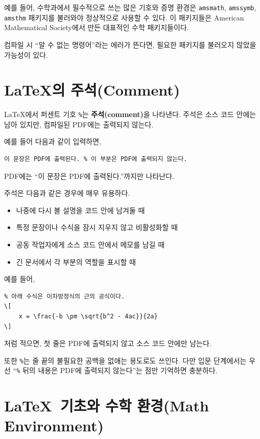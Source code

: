 \documentclass[11pt, a4paper]{article}
\theoremstyle{plain}
\theoremstyle{definition}
\theoremstyle{remark}
\begin{document}
예를 들어, 수학과에서 필수적으로 쓰는 많은 기호와 증명 환경은 \verb|amsmath|, \verb|amssymb|, \verb|amsthm| 패키지를 불러와야 정상적으로 사용할 수 있다. 이 패키지들은 American Mathematical Society에서 만든 대표적인 수학 패키지들이다.

컴파일 시 ``알 수 없는 명령어''라는 에러가 뜬다면, 필요한 패키지를 불러오지 않았을 가능성이 있다.

\section{{\LaTeX}의 주석(Comment)}

{\LaTeX}에서 퍼센트 기호 \verb|%|는 \textbf{주석(comment)}을 나타낸다.
주석은 소스 코드 안에는 남아 있지만, 컴파일된 PDF에는 출력되지 않는다.

예를 들어 다음과 같이 입력하면,

\begin{verbatim}
이 문장은 PDF에 출력된다. % 이 부분은 PDF에 출력되지 않는다.
\end{verbatim}

PDF에는 ``이 문장은 PDF에 출력된다.''까지만 나타난다.

주석은 다음과 같은 경우에 매우 유용하다.
\begin{itemize}
    \item 나중에 다시 볼 설명을 코드 안에 남겨둘 때
    \item 특정 문장이나 수식을 잠시 지우지 않고 비활성화할 때
    \item 공동 작업자에게 소스 코드 안에서 메모를 남길 때
    \item 긴 문서에서 각 부분의 역할을 표시할 때
\end{itemize}

예를 들어,

\begin{verbatim}
% 아래 수식은 이차방정식의 근의 공식이다.
\[
    x = \frac{-b \pm \sqrt{b^2 - 4ac}}{2a}
\]
\end{verbatim}

처럼 적으면, 첫 줄은 PDF에 출력되지 않고 소스 코드 안에만 남는다.

또한 \verb|%|는 줄 끝의 불필요한 공백을 없애는 용도로도 쓰인다.
다만 입문 단계에서는 우선 ``\verb|%| 뒤의 내용은 PDF에 출력되지 않는다''는 점만 기억하면 충분하다.

\section{\LaTeX\ 기초와 수학 환경(Math Environment)}
\end{document}
